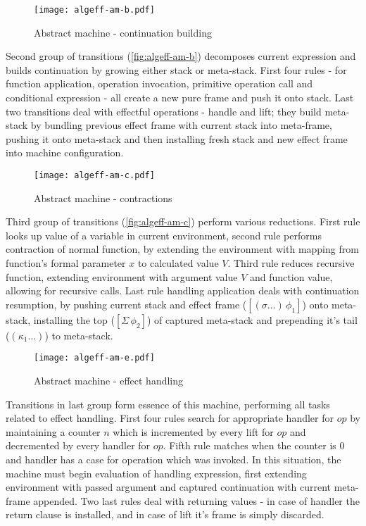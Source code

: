 \documentclass[inz, english, shortabstract]{iithesis}
\begin{document}
\begin{figure}[h]
  \centering
  \texttt{[image: algeff-am-b.pdf]} 
  \caption{Abstract machine - continuation building}
  \label{fig:algeff-am-b}
\end{figure}

Second group of transitions (\autoref{fig:algeff-am-b}) decomposes current expression and builds continuation by growing either stack or meta-stack.
First four rules - for function application, operation invocation, primitive operation call and conditional expression - all create a new pure frame and push it onto stack.
Last two transitions deal with effectful operations - handle and lift; they build meta-stack by bundling previous effect frame with current stack into meta-frame, pushing it onto meta-stack and then installing fresh stack and new effect frame into machine configuration.

\begin{figure}[h]
  \centering 
  \texttt{[image: algeff-am-c.pdf]}
  \caption{Abstract machine - contractions}
  \label{fig:algeff-am-c}
\end{figure}

Third group of transitions (\autoref{fig:algeff-am-c}) perform various reductions.
First rule looks up value of a variable in current environment, second rule performs contraction of normal function, by extending the environment with mapping from function's formal parameter $ x $ to calculated value $ V $.
Third rule reduces recursive function, extending environment with argument value $ V $ and function value, allowing for recursive calls.
Last rule handling application deals with continuation resumption, by pushing current stack and effect frame ($ [(\sigma \ldots) \, \phi_1] $) onto meta-stack, installing the top ($ [\Sigma \, \phi_2] $) of captured meta-stack and prepending it's tail ($ (\kappa_1 \ldots) $) to meta-stack.

\begin{figure}[h]
  \centering
  \texttt{[image: algeff-am-e.pdf]}
  \caption{Abstract machine - effect handling}
  \label{fig:algeff-am-e}
\end{figure}

Transitions in last group form essence of this machine, performing all tasks related to effect handling.
First four rules search for appropriate handler for $ op $ by maintaining a counter $ n $ which is incremented by every lift for $ op $ and decremented by every handler for $ op $.
Fifth rule matches when the counter is $ 0 $ and handler has a case for operation which was invoked. 
In this situation, the machine must begin evaluation of handling expression, first extending environment with passed argument and captured continuation with current meta-frame appended.
Two last rules deal with returning values - in case of handler the return clause is installed, and in case of lift it's frame is simply discarded.
\end{document}
